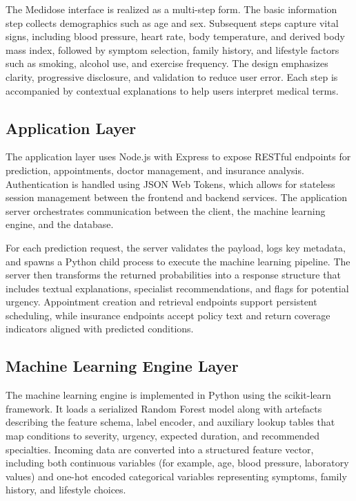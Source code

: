 \documentclass[conference]{IEEEtran}
\begin{document}
The Medidose interface is realized as a multi-step form. The basic information step collects demographics such as age and sex. Subsequent steps capture vital signs, including blood pressure, heart rate, body temperature, and derived body mass index, followed by symptom selection, family history, and lifestyle factors such as smoking, alcohol use, and exercise frequency. The design emphasizes clarity, progressive disclosure, and validation to reduce user error. Each step is accompanied by contextual explanations to help users interpret medical terms.

\subsection{Application Layer}

The application layer uses Node.js with Express to expose RESTful endpoints for prediction, appointments, doctor management, and insurance analysis. Authentication is handled using JSON Web Tokens, which allows for stateless session management between the frontend and backend services. The application server orchestrates communication between the client, the machine learning engine, and the database.

For each prediction request, the server validates the payload, logs key metadata, and spawns a Python child process to execute the machine learning pipeline. The server then transforms the returned probabilities into a response structure that includes textual explanations, specialist recommendations, and flags for potential urgency. Appointment creation and retrieval endpoints support persistent scheduling, while insurance endpoints accept policy text and return coverage indicators aligned with predicted conditions.

\subsection{Machine Learning Engine Layer}

The machine learning engine is implemented in Python using the scikit-learn framework. It loads a serialized Random Forest model along with artefacts describing the feature schema, label encoder, and auxiliary lookup tables that map conditions to severity, urgency, expected duration, and recommended specialties. Incoming data are converted into a structured feature vector, including both continuous variables (for example, age, blood pressure, laboratory values) and one-hot encoded categorical variables representing symptoms, family history, and lifestyle choices.
\end{document}
